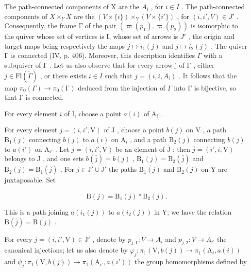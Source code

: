 The path-connected components of X are the \(A_{i}\) , for \(i \in I\) . The path-connected components of \(X \times_{Y} X\) are the \((V \times \{i\}) \times_{Y} (V \times \{i'\})\) , for \((i, i', V) \in J'\) . Consequently, the frame \(\textsf{Γ}\) of the pair \((\varpi(p_1), \varpi(p_2))\) is isomorphic to the quiver whose set of vertices is I, whose set of arrows is \(J'\) , the origin and target maps being respectively the maps \(j \mapsto i_1(j)\) and \(j \mapsto i_2(j)\) . The quiver \(\textsf{Γ}\) is connected (IV, p. 406). Moreover, this description identifies \(\Gamma\) with a subquiver of \(\textsf{Γ}\) . Let us also observe that for every arrow j of \(\textsf{Γ}\) , either \(j \in \mathrm{Fl}(\widetilde{\Gamma})\) , or there exists \(i \in I\) such that \(j = (i, i, A_i)\) . It follows that the map \(\pi_0(\Gamma) \to \pi_0(\textsf{Γ})\) deduced from the injection of \(\Gamma\) into \(\textsf{Γ}\) is bijective, so that \(\textsf{Γ}\) is connected.

For every element \(i\) of I, choose a point \(a(i)\) of \(\mathrm{A}_i\) .

For every element \(j = (i, i', \mathrm{V})\) of \(\mathrm{J}\) , choose a point \(b(j)\) on \(\mathrm{V}\) , a path \(\mathrm{B}_1(j)\) connecting \(b(j)\) to \(a(i)\) on \(\mathrm{A}_i\) , and a path \(\mathrm{B}_2(j)\) connecting \(b(j)\) to \(a(i')\) on \(\mathrm{A}_{i'}\) . Let \(j = (i, i', \mathrm{V})\) be an element of \(\overline{\mathrm{J}}\) ; then \(\overline{j} = (i', i, \mathrm{V})\) belongs to \(\mathrm{J}\) , and one sets \(b(\overline{j}) = b(j)\) , \(\mathrm{B}_1(j) = \mathrm{B}_2(\overline{j})\) and \(\mathrm{B}_2(j) = \mathrm{B}_1(\overline{j})\) . For \(j \in \mathrm{J}' \cup \overline{\mathrm{J}'}\) the paths \(\overline{\mathrm{B}_1(j)}\) and \(\mathrm{B}_2(j)\) on \(\mathrm{Y}\) are juxtaposable. Set

\[
\mathrm{B} (j) = \overline {{\mathrm{B} _ {1} (j)}} * \mathrm{B} _ {2} (j).\tag{3}
\]

This is a path joining \(a(i_1(j))\) to \(a(i_2(j))\) in Y; we have the relation \(\mathrm{B}(\overline{j}) = \overline{\mathrm{B}(j)}\) .

For every \(j = (i, i', \mathrm{V}) \in \mathrm{J}'\) , denote by \(p_{j,1} \colon V \to A_i\) and \(p_{j,2} \colon V \to A_{i'}\) the canonical injections; let us also denote by \(\varphi_j \colon \pi_1(\mathrm{V}, b(j)) \to \pi_1(\mathrm{A}_i, a(i))\) and \(\psi_j \colon \pi_1(\mathrm{V}, b(j)) \to \pi_1(\mathrm{A}_{i'}, a(i'))\) the group homomorphisms defined by

